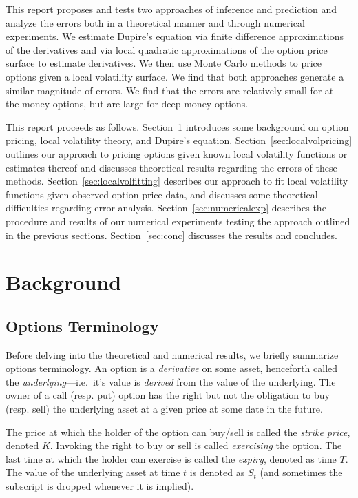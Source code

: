 \documentclass[11pt]{article}
\numberwithin{equation}{section}
\begin{document}
This report proposes and tests two approaches of inference and prediction and
analyze the errors both  in  a theoretical manner and through numerical
experiments. We estimate Dupire's equation via finite difference approximations
of the derivatives and via local quadratic approximations of the option price
surface to estimate derivatives. We then use Monte Carlo methods to price
options given a local volatility surface. We find that both approaches generate
a similar magnitude of errors. We find that the errors are relatively small for
at-the-money options, but are large for deep-money options. 

This report proceeds as follows. Section~\ref{sec:background} introduces some
background on option pricing, local volatility theory, and Dupire's equation.
Section~\ref{sec:localvolpricing} outlines our approach to pricing options given
known local volatility functions or estimates thereof and discusses theoretical
results regarding the errors of these methods. Section~\ref{sec:localvolfitting}
describes our approach to fit local volatility functions given observed option
price data, and discusses some theoretical difficulties regarding error
analysis. Section~\ref{sec:numericalexp} describes the procedure and results of
our numerical experiments testing the approach outlined in the previous
sections. Section~\ref{sec:conc} discusses the results and concludes.

\section{Background}
\label{sec:background}

\subsection{Options Terminology}
\label{subsec:terminology}

Before delving into the theoretical and numerical results, we briefly summarize
options terminology. An option is a \emph{derivative} on some asset, henceforth
called the \emph{underlying}---i.e.\ it's value is \emph{derived} from the value
of the underlying. The owner of a call (resp. put) option has the right but not
the obligation to buy (resp. sell) the underlying asset at a given price at some
date in the future.

The price at which the holder of the option can buy/sell is called the
\emph{strike price}, denoted $K$. Invoking the right to buy or sell is called
\emph{exercising} the option. The last time at which the holder can exercise is
called the \emph{expiry}, denoted as time $T$. The value of the underlying asset
at time $t$ is denoted as $S_t$ (and sometimes the subscript is dropped whenever
it is implied). 
\end{document}

